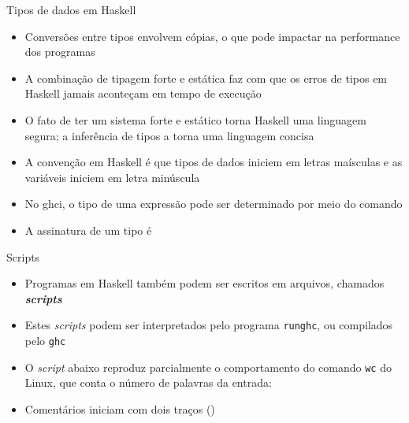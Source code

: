 \begin{frame}[fragile]{Tipos de dados em Haskell}

    \begin{itemize}
        \item Conversões entre tipos envolvem cópias, o que pode impactar na performance dos
            programas

        \item A combinação de tipagem forte e estática faz com que os erros de tipos em Haskell
            jamais aconteçam em tempo de execução

        \item O fato de ter um sistema forte e estático torna Haskell uma linguagem segura; a 
            inferência de tipos a torna uma linguagem concisa

        \item A convenção em Haskell é que tipos de dados iniciem em letras maísculas e
            as variáveis iniciem em letra minúscula

        \item No ghci, o tipo de uma expressão pode ser determinado por meio do comando

        \item A assinatura de um tipo é 

    \end{itemize}

\end{frame}

\begin{frame}[fragile]{Scripts}

    \begin{itemize}
        \item Programas em Haskell também podem ser escritos em arquivos, chamados 
            \textit{\textbf{scripts}}

        \item Estes \textit{scripts} podem ser interpretados pelo programa \texttt{runghc}, ou
            compilados pelo \texttt{ghc}

        \item O \textit{script} abaixo reproduz parcialmente o comportamento do comando 
            \texttt{wc} do Linux, que conta o número de palavras da entrada:


        \item Comentários iniciam com dois traços ()
    \end{itemize}

\end{frame}
